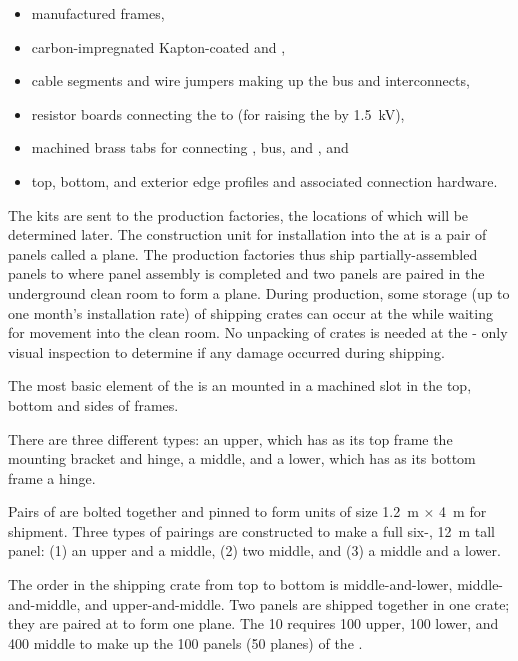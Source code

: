 \begin{itemize}
\item manufactured \frfour {} frames, %
\item carbon-impregnated Kapton-coated  and ,
\item {} cable segments and wire jumpers making up the   bus and  interconnects,
\item resistor boards connecting the  to  (for raising the   by \SI{1.5}{\kV}),
\item machined brass tabs for connecting ,  bus, and , and
\item top, bottom, and exterior edge profiles and associated connection hardware.
\end{itemize}
The kits are sent to the production factories, the locations of which will be determined later.  
The %
 construction unit for installation into the  at \surf is a pair of  panels called a  plane. The production factories thus ship partially-assembled  panels to \surf where panel assembly is completed and two panels are paired in the underground clean room to form a  plane. During production, some storage (up to one month's installation rate) of  shipping crates can occur at the  while waiting for movement into the \surf clean room.  No unpacking of crates is needed at the  - only visual inspection to determine if any damage occurred during shipping.

The most basic element of the  
is an  mounted in a machined slot in the top, bottom and sides of \frfour frames.  


There are three different  types: an upper, which has as its top frame the  mounting bracket and  hinge, a middle, and a lower, which has as its bottom frame a  hinge.  

Pairs of  are bolted together and pinned to form  units of size \SI{1.2}{\m} $\times$ \SI{4}{\m} for shipment. Three types of pairings are constructed to make a full six-, \SI{12}{\m} tall  panel: (1) an upper and a middle, (2) two middle, and (3) a middle and a lower.

The order in the shipping crate from top to bottom is middle-and-lower, middle-and-middle, and upper-and-middle.   Two  panels are shipped together in one crate; they are paired at \surf to form one  plane.  The \SI{10}{\kt}  requires 100 upper, 100 lower, and 400 middle  to make up the 100  panels (50  planes) of the .


